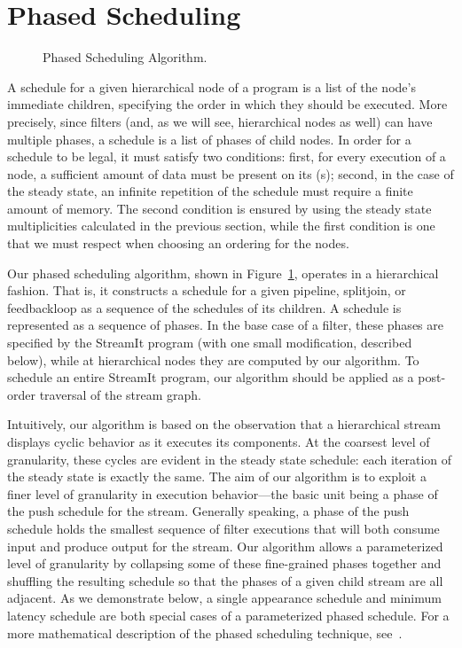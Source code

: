 \section{Phased Scheduling}
\label{chpt:phased}

\begin{figure}[t]
\vspace{-22pt}
\caption{\small Phased Scheduling Algorithm.\protect\label{fig:phasealg}}
\vspace{-18pt}
\end{figure}

A schedule for a given hierarchical node of a {\StreamIt} program is a
list of the node's immediate children, specifying the order in which
they should be executed.  More precisely, since filters (and, as we
will see, hierarchical nodes as well) can have multiple phases, a
schedule is a list of phases of child nodes.  In order for a schedule
to be legal, it must satisfy two conditions: first, for every
execution of a node, a sufficient amount of data must be present on
its {\Input} {\Channel}(s); second, in the case of the steady state,
an infinite repetition of the schedule must require a finite amount of
memory.  The second condition is ensured by using the steady state
multiplicities calculated in the previous section, while the first
condition is one that we must respect when choosing an ordering for
the nodes.

Our phased scheduling algorithm, shown in Figure~\ref{fig:phasealg},
operates in a hierarchical fashion.  That is, it constructs a schedule
for a given pipeline, splitjoin, or feedbackloop as a sequence of the
schedules of its children.  A schedule is represented as a sequence of
phases.  In the base case of a filter, these phases are specified by
the StreamIt program (with one small modification, described below),
while at hierarchical nodes they are computed by our algorithm.  To
schedule an entire StreamIt program, our algorithm should be applied
as a post-order traversal of the stream graph.

Intuitively, our algorithm is based on the observation that a
hierarchical stream displays cyclic behavior as it executes its
components.  At the coarsest level of granularity, these cycles are
evident in the steady state schedule: each iteration of the steady
state is exactly the same.  The aim of our algorithm is to exploit a
finer level of granularity in execution behavior---the basic unit
being a phase of the push schedule for the stream.  Generally
speaking, a phase of the push schedule holds the smallest sequence of
filter executions that will both consume input and produce output for
the stream.  Our algorithm allows a parameterized level of granularity
by collapsing some of these fine-grained phases together and shuffling
the resulting schedule so that the phases of a given child stream are
all adjacent.  As we demonstrate below, a single appearance schedule
and minimum latency schedule are both special cases of a parameterized
phased schedule.  For a more mathematical description of the phased
scheduling technique, see~\cite{karczma-thesis}.


